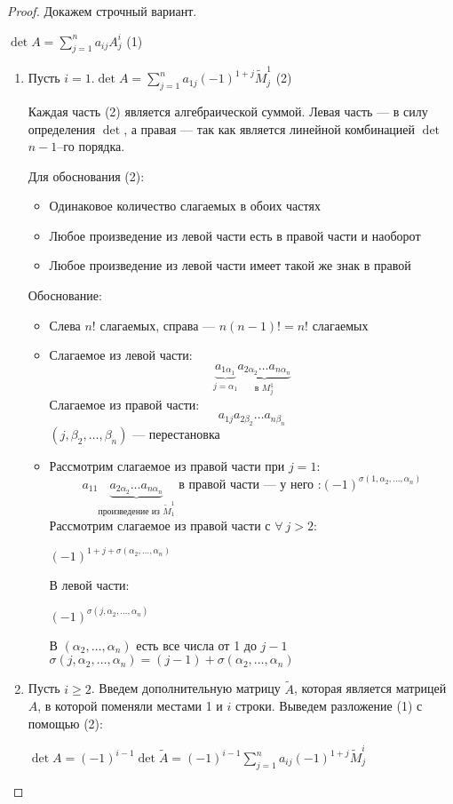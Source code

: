 \begin{proof}Докажем строчный вариант.

$\det{A}=\sum\limits_{j=1}^na_{ij}A^i_j$ (1)

\begin{enumerate}
\item Пусть $i=1$.$\det{A}=\sum\limits_{j=1}^na_{1j}(-1)^{1+j}\tilde{M}^1_j$ (2)

Каждая часть (2) является алгебраической суммой. Левая часть --- в силу определения $\det$, а правая --- так как является линейной комбинацией $\det$ $n-1$--го порядка.

Для обоснования (2):\begin{itemize}
\item Одинаковое количество слагаемых в обоих частях
\item Любое произведение из левой части есть в правой части и наоборот
\item Любое произведение из левой части имеет такой же знак в правой
\end{itemize}
Обоснование:\begin{itemize}
\item Слева $n!$ слагаемых, справа --- $n(n-1)!=n!$ слагаемых
\item Слагаемое из левой части:
$$\underbrace{a_{1\alpha_1}}_{j=\alpha_1}\underbrace{a_{2\alpha_2}\ldots{}a_{n\alpha_n}}_{\mbox{в }M^1_j}$$
Слагаемое из правой части:
$$a_{1j}a_{2\beta_2}\ldots{}a_{n\beta_n}$$
$(j,\beta_2,\ldots,\beta_n)$ --- перестановка
\item Рассмотрим слагаемое из правой части при $j=1$:
$$
a_{11}\underbrace{a_{2\alpha_2}\ldots{}a_{n\alpha_n}}_{\mbox{произведение из }\tilde{M}^1_1}\mbox{ в правой части --- у него :}(-1)^{\sigma(1,\alpha_2,\ldots,\alpha_n)}
$$
Рассмотрим слагаемое из правой части с $\forall\ j>2$:

$(-1)^{1+j+\sigma(\alpha_2,\ldots,\alpha_n)}$

В левой части:

$(-1)^{\sigma(j,\alpha_2,\ldots,\alpha_n)}$

В $(\alpha_2,\ldots,\alpha_n)$ есть все числа от 1 до $j-1$ \then $\sigma(j,\alpha_2,\ldots,\alpha_n)=(j-1)+\sigma(\alpha_2,\ldots,\alpha_n)$
\end{itemize}
\item Пусть $i\geq2$. Введем дополнительную матрицу $\tilde{A}$, которая является матрицей $A$, в которой поменяли местами 1 и $i$ строки. Выведем разложение (1) с помощью (2):

$\det{A}=(-1)^{i-1}\det{\tilde{A}}=(-1)^{i-1}\sum\limits_{j=1}^na_{ij}(-1)^{1+j}\tilde{M}^i_j$
\end{enumerate}
\end{proof}
